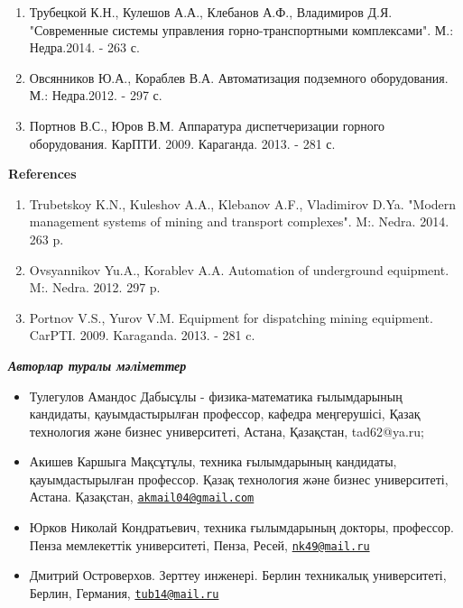 \begin{enumerate}
\item
Трубецкой К.Н., Кулешов А.А., Клебанов А.Ф., Владимиров Д.Я.
"Современные системы управления горно-транспортными комплексами". М.:
Недра.2014. - 263 с.

\item
Овсянников Ю.А., Кораблев В.А. Автоматизация подземного оборудования.
М.: Недра.2012. - 297 с.

\item
Портнов В.С., Юров В.М. Аппаратура диспетчеризации горного
оборудования. КарПТИ. 2009. Караганда. 2013. - 281 с.
\end{enumerate}

\begin{center}
{\bfseries References}
\end{center}

\begin{enumerate}
\item
Trubetskoy K.N., Kuleshov A.A., Klebanov A.F., Vladimirov D.Ya.
"Modern management systems of mining and transport complexes". M:.
Nedra. 2014. 263 p.

\item
Ovsyannikov Yu.A., Korablev A.A. Automation of underground equipment.
M:. Nedra. 2012. 297 p.

\item
Portnov V.S., Yurov V.M. Equipment for dispatching mining equipment.
CarPTI. 2009. Karaganda. 2013. - 281 c.
\end{enumerate}

\emph{{\bfseries Авторлар туралы мәліметтер}}

\begin{itemize}
\item
Тулегулов Амандос Дабысұлы - физика-математика ғылымдарының кандидаты,
қауымдастырылған профессор, кафедра меңгерушісі, Қазақ технология және
бизнес университеті, Астана, Қазақстан, tad62@ya.ru;

\item
Акишев Каршыга Мақсұтұлы, техника ғылымдарының кандидаты,
қауымдастырылған профессор. Қазақ технология және бизнес университеті,
Астана. Қазақстан,
\href{mailto:akmail04@gmail.com}{\nolinkurl{akmail04@gmail.com}}

\item
Юрков Николай Кондратьевич, техника ғылымдарының докторы, профессор.
Пенза мемлекеттік университеті, Пенза, Ресей,
\href{mailto:nk49@mail.ru}{\nolinkurl{nk49@mail.ru}}

\item
Дмитрий Островерхов. Зерттеу инженері. Берлин техникалық университеті,
Берлин, Германия, \href{mailto:tub14@mail.ru}{\nolinkurl{tub14@mail.ru}}
\end{itemize}


